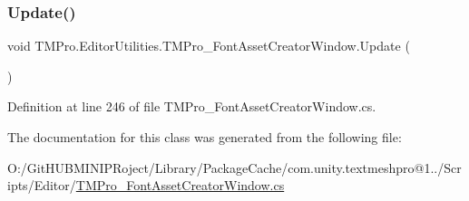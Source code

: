 \mbox{\label{class_t_m_pro_1_1_editor_utilities_1_1_t_m_pro___font_asset_creator_window_a3acb07af5f723170bb73abc76d7b6de1}} 
\subsubsection{\texorpdfstring{Update()}{Update()}}
{\footnotesize\ttfamily void T\+M\+Pro.\+Editor\+Utilities.\+T\+M\+Pro\+\_\+\+Font\+Asset\+Creator\+Window.\+Update (\begin{DoxyParamCaption}{ }\end{DoxyParamCaption})}



Definition at line 246 of file T\+M\+Pro\+\_\+\+Font\+Asset\+Creator\+Window.\+cs.



The documentation for this class was generated from the following file\+:\begin{DoxyCompactItemize}
\item 
O\+:/\+Git\+H\+U\+B\+M\+I\+N\+I\+P\+Roject/\+Library/\+Package\+Cache/com.\+unity.\+textmeshpro@1../\+Scripts/\+Editor/\mbox{\hyperlink{_t_m_pro___font_asset_creator_window_8cs}{T\+M\+Pro\+\_\+\+Font\+Asset\+Creator\+Window.\+cs}}\end{DoxyCompactItemize}
